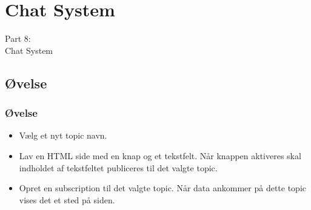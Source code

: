 \section{Chat System}
\begin{frame}
    \vspace{25mm}
    \begin{center}
        \Huge{Part 8:\\Chat System}
    \end{center}
\end{frame}

\subsection{Øvelse}
\begin{frame}
    \frametitle{Øvelse}
    \begin{itemize}
      \item Vælg et nyt topic navn.
      \item Lav en HTML side med en knap og et tekstfelt. Når knappen aktiveres skal indholdet af tekstfeltet publiceres til det valgte topic.
      \item Opret en subscription til det valgte topic. Når data ankommer på dette topic vises det et sted på siden.
    \end{itemize}
\end{frame}

